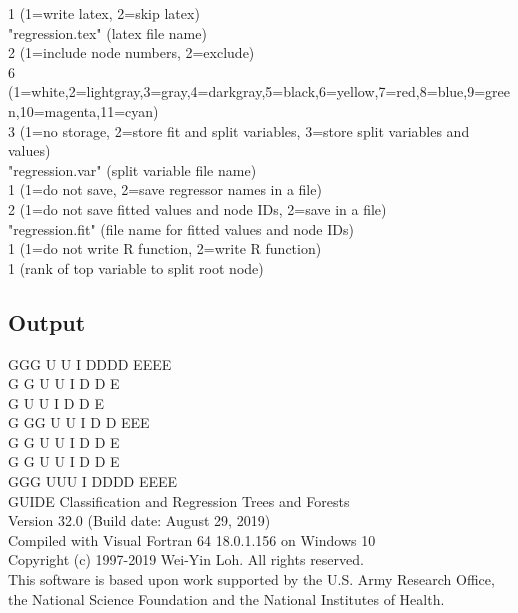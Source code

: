 \documentclass[12pt]{article}
\begin{document}
 1          (1=write latex, 2=skip latex)\\
"regression.tex" (latex file name)\\
 2          (1=include node numbers, 2=exclude)\\
 6          (1=white,2=lightgray,3=gray,4=darkgray,5=black,6=yellow,7=red,8=blue,9=green,10=magenta,11=cyan)\\
 3          (1=no storage, 2=store fit and split variables, 3=store split variables and values)\\
"regression.var" (split variable file name)\\
 1          (1=do not save, 2=save regressor names in a file)\\
 2          (1=do not save fitted values and node IDs, 2=save in a file)\\
"regression.fit" (file name for fitted values and node IDs)\\
 1          (1=do not write R function, 2=write R function)\\
 1          (rank of top variable to split root node)\\

\subsection{Output}
             GGG   U   U  I  DDDD   EEEE\\
            G   G  U   U  I  D   D  E\\
            G      U   U  I  D   D  E\\
            G  GG  U   U  I  D   D  EEE\\
            G   G  U   U  I  D   D  E\\
            G   G  U   U  I  D   D  E\\
             GGG    UUU   I  DDDD   EEEE\\
   
 GUIDE Classification and Regression Trees and Forests\\
 Version 32.0 (Build date: August 29, 2019)        \\
 Compiled with Visual Fortran 64 18.0.1.156 on Windows 10\\              
 Copyright (c) 1997-2019 Wei-Yin Loh. All rights reserved.\\
 This software is based upon work supported by the U.S. Army Research Office,\\
 the National Science Foundation and the National Institutes of Health.
  
\end{document}
